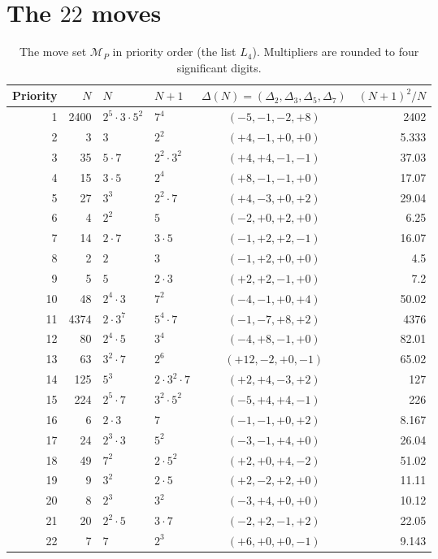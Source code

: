 \documentclass[11pt,a4paper]{article}
\theoremstyle{definition}
\begin{document}
\section{The $22$ moves}
\begin{table}[h]
\centering\small
\begin{tabular}{@{}rrllcr@{}}
\toprule
Priority & $N$ & $N$ & $N+1$ & $\Delta(N)=(\Delta_2,\Delta_3,\Delta_5,\Delta_7)$ & $(N+1)^2/N$\\
\midrule
1 & 2400 & $2^{5}\cdot 3\cdot 5^{2}$ & $7^{4}$ & $(-5,-1,-2,+8)$ & 2402 \\
2 & 3 & $3$ & $2^{2}$ & $(+4,-1,+0,+0)$ & 5.333 \\
3 & 35 & $5\cdot 7$ & $2^{2}\cdot 3^{2}$ & $(+4,+4,-1,-1)$ & 37.03 \\
4 & 15 & $3\cdot 5$ & $2^{4}$ & $(+8,-1,-1,+0)$ & 17.07 \\
5 & 27 & $3^{3}$ & $2^{2}\cdot 7$ & $(+4,-3,+0,+2)$ & 29.04 \\
6 & 4 & $2^{2}$ & $5$ & $(-2,+0,+2,+0)$ & 6.25 \\
7 & 14 & $2\cdot 7$ & $3\cdot 5$ & $(-1,+2,+2,-1)$ & 16.07 \\
8 & 2 & $2$ & $3$ & $(-1,+2,+0,+0)$ & 4.5 \\
9 & 5 & $5$ & $2\cdot 3$ & $(+2,+2,-1,+0)$ & 7.2 \\
10 & 48 & $2^{4}\cdot 3$ & $7^{2}$ & $(-4,-1,+0,+4)$ & 50.02 \\
11 & 4374 & $2\cdot 3^{7}$ & $5^{4}\cdot 7$ & $(-1,-7,+8,+2)$ & 4376 \\
12 & 80 & $2^{4}\cdot 5$ & $3^{4}$ & $(-4,+8,-1,+0)$ & 82.01 \\
13 & 63 & $3^{2}\cdot 7$ & $2^{6}$ & $(+12,-2,+0,-1)$ & 65.02 \\
14 & 125 & $5^{3}$ & $2\cdot 3^{2}\cdot 7$ & $(+2,+4,-3,+2)$ & 127 \\
15 & 224 & $2^{5}\cdot 7$ & $3^{2}\cdot 5^{2}$ & $(-5,+4,+4,-1)$ & 226 \\
16 & 6 & $2\cdot 3$ & $7$ & $(-1,-1,+0,+2)$ & 8.167 \\
17 & 24 & $2^{3}\cdot 3$ & $5^{2}$ & $(-3,-1,+4,+0)$ & 26.04 \\
18 & 49 & $7^{2}$ & $2\cdot 5^{2}$ & $(+2,+0,+4,-2)$ & 51.02 \\
19 & 9 & $3^{2}$ & $2\cdot 5$ & $(+2,-2,+2,+0)$ & 11.11 \\
20 & 8 & $2^{3}$ & $3^{2}$ & $(-3,+4,+0,+0)$ & 10.12 \\
21 & 20 & $2^{2}\cdot 5$ & $3\cdot 7$ & $(-2,+2,-1,+2)$ & 22.05 \\
22 & 7 & $7$ & $2^{3}$ & $(+6,+0,+0,-1)$ & 9.143 \\
\bottomrule
\end{tabular}
\caption{The move set $\mathcal{M}_P$ in priority order (the list $L_4$). Multipliers are rounded to four significant digits.}
\label{tab:moves}
\end{table}
\end{document}
